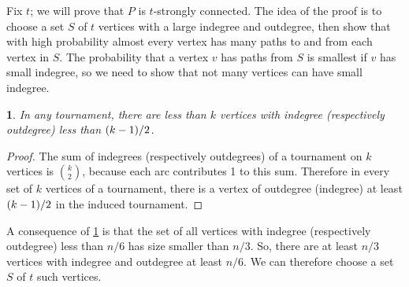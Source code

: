 \documentclass[11pt,english]{article}
\theoremstyle{plain}
\theoremstyle{definition}
\theoremstyle{definition}
\theoremstyle{plain}
\theoremstyle{plain}
\theoremstyle{plain}
\newtheorem{lem}[thm]{\protect\lemmaname}
\theoremstyle{plain}
\theoremstyle{remark}
\theoremstyle{remark}
\let\originalleft\left
\let\originalright\right
\renewcommand{\left}{\mathopen{}\mathclose\bgroup\originalleft}
\renewcommand{\right}{\aftergroup\egroup\originalright}
\providecommand{\lemmaname}{Lemma}
\begin{document}
Fix $t$; we will prove that $P$ is $t$-strongly connected. The
idea of the proof is to choose a set $S$ of $t$ vertices with a
large indegree and outdegree, then show that with high probability
almost every vertex has many paths to and from each vertex in $S$.
The probability that a vertex $v$ has paths from $S$ is smallest
if $v$ has small indegree, so we need to show that not many vertices
can have small indegree.
\begin{lem}
\label{lem:extreme-indegree-bound}In any tournament, there are less
than $k$ vertices with indegree (respectively outdegree) less than
$\left(k-1\right)/2$.\end{lem}
\begin{proof}
The sum of indegrees (respectively outdegrees) of a tournament on
$k$ vertices is ${k \choose 2}$, because each arc contributes 1
to this sum. Therefore in every set of $k$ vertices of a tournament,
there is a vertex of outdegree (indegree) at least $\left(k-1\right)/2$
in the induced tournament.
\end{proof}
A consequence of \ref{lem:extreme-indegree-bound} is that the set
of all vertices with indegree (respectively outdegree) less than $n/6$
has size smaller than $n/3$. So, there are at least $n/3$ vertices
with indegree and outdegree at least $n/6$. We can therefore choose
a set $S$ of $t$ such vertices.
\end{document}
